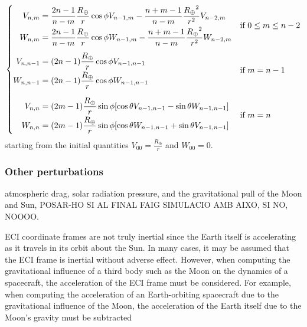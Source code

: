 \documentclass[../main.tex]{subfiles}
\begin{document}
\begin{align*}
  \begin{cases}
    \hspace{8pt}\begin{aligned}
                  V_{n,m} & =\frac{2n-1}{n-m} \frac{R_\oplus}{r}\cos\phi V_{n-1,m}-\frac{n+m-1}{n-m}\frac{{R_\oplus}^2}{r^2}V_{n-2,m} \\[0.1cm]
                  W_{n,m} & =\frac{2n-1}{n-m} \frac{R_\oplus}{r}\cos\phi W_{n-1,m}-\frac{n+m-1}{n-m}\frac{{R_\oplus}^2}{r^2}W_{n-2,m}
                \end{aligned} & \text{if $0\leq m\leq n-2$} \\[0.9cm]
    \begin{aligned}
      V_{n,n-1} & =(2n-1) \frac{R_\oplus}{r}\cos\phi V_{n-1,n-1} \\[0.1cm]
      W_{n,n-1} & =(2n-1) \frac{R_\oplus}{r}\cos\phi W_{n-1,n-1}
    \end{aligned}                                                                                       & \text{if $m=n-1$}                                               \\[0.9cm]
    \hspace{10.25pt}\begin{aligned}
                      V_{n,n} & =(2m-1)\frac{R_\oplus}{r}\sin\phi[\cos\theta V_{n-1,n-1}-\sin\theta W_{n-1,n-1}] \\[0.1cm]
                      W_{n,n} & =(2m-1)\frac{R_\oplus}{r}\sin\phi[\cos\theta W_{n-1,n-1}+\sin\theta V_{n-1,n-1}]
                    \end{aligned}                 & \text{if $m=n$}
  \end{cases}
\end{align*}
starting from the initial quantities $V_{00}= \frac{R_\oplus}{r}$ and $W_{00}= 0$.
\subsubsection{Other perturbations}
atmospheric drag, solar radiation pressure, and the gravitational pull of the Moon and Sun,
POSAR-HO SI AL FINAL FAIG SIMULACIO AMB AIXO, SI NO, NOOOO.

ECI coordinate frames are not truly inertial since the Earth itself is accelerating as it travels in its orbit about the Sun. In many cases, it may be assumed that the ECI frame is inertial without adverse effect. However, when computing the gravitational influence of a third body such as the Moon on the dynamics of a spacecraft, the acceleration of the ECI frame must be considered. For example, when computing the acceleration of an Earth-orbiting spacecraft due to the gravitational influence of the Moon, the acceleration of the Earth itself due to the Moon's gravity must be subtracted
\end{document}
